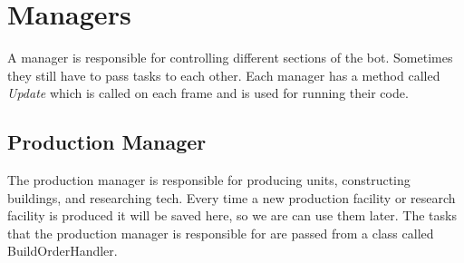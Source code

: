 \section{Managers}
	A manager is responsible for controlling different sections of the bot. Sometimes they still have to pass tasks to each other. Each manager has 
	a method called \textit{Update} which is called on each frame and is used for running their code.
	\subsection{Production Manager}
		The production manager is responsible for producing units, constructing buildings, and researching tech. Every time a new production facility or 
		 research facility is produced it will be saved here, so we are can use them later. 
		The tasks that the production manager is responsible for are passed from a 
		class called BuildOrderHandler.
